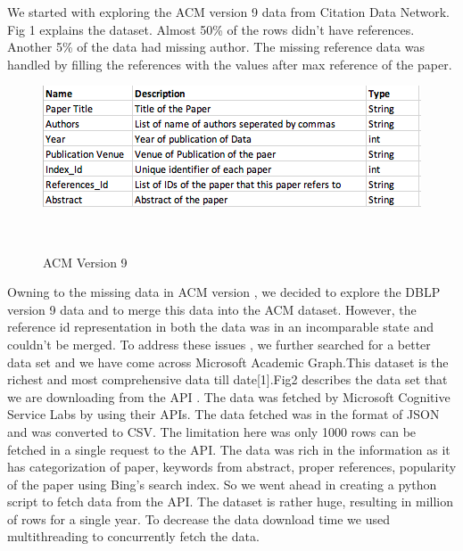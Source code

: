 \documentclass[a4paper, 11pt]{article}
\begin{document}
We started with exploring the ACM version 9 data from Citation Data Network. Fig 1 explains the dataset. Almost 50\% of the rows didn't have references. Another 5\% of the data had missing author. The missing reference data was handled by filling the references with the values after max reference of the paper.
\begin{figure}[ht]
\centering
  \includegraphics[width=0.7\columnwidth]{ACM_Versio_9_DataSet.png}
  \caption{ACM Version 9}~\label{fig: Microsoft Academic Graph}
\end{figure}
\FloatBarrier
Owning to the missing data in ACM version , we decided to explore the DBLP version 9 data and to merge this data into the ACM dataset. However, the reference id representation in both the data was in an incomparable state and couldn't be merged.
\newline 
To address these issues , we further searched for a better data set and we have come across Microsoft Academic Graph.This dataset is the richest and most comprehensive data till date[1].Fig2 describes the data set that we are downloading from the API . The data was fetched by Microsoft Cognitive Service Labs by using their APIs. The data fetched was in the format of JSON and was converted to CSV.  The limitation here was only 1000 rows can be fetched in a single request to the API. The data was rich in the information as it has categorization of paper, keywords from abstract, proper references, popularity of the paper using Bing's search index. So we went ahead in creating a python script to fetch data from the API. The dataset is rather huge, resulting in million of rows for a single year. To decrease the data download time we used multithreading to concurrently fetch the data.\\
\end{document}
